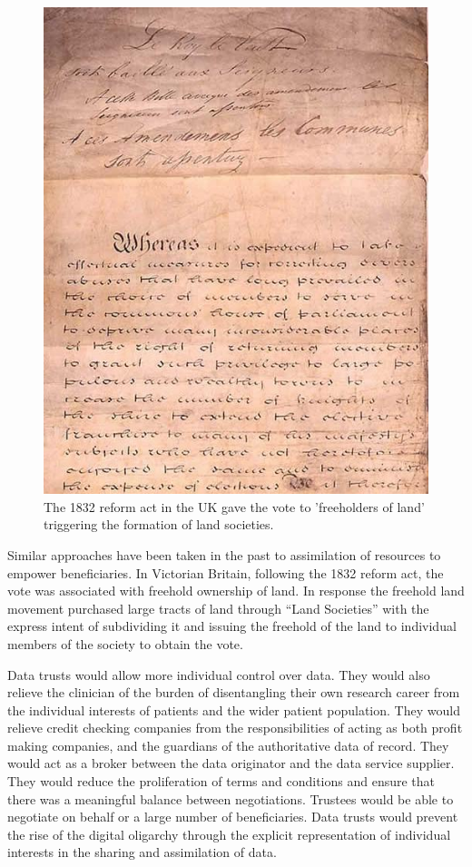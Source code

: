\documentclass[a4paper]{caesar_book}
\begin{document}
\begin{figure}[htbp]%
	\includegraphics[width=\textwidth]{pictures/Reform_Act_1832_First_Page.jpg}%
	\caption*{The 1832 reform act in the UK gave the vote to 'freeholders of land' triggering the formation of land societies.}%
	\label{reform-act}%
\end{figure}%

Similar approaches have been taken in the past to assimilation of resources to empower beneficiaries. In Victorian Britain, following the 1832 reform act, the vote was associated with freehold ownership of land. In response the freehold land movement purchased large tracts of land through “Land Societies” with the express intent of subdividing it and issuing the freehold of the land to individual members of the society to obtain the vote.

Data trusts would allow more individual control over data. They would also relieve the clinician of the burden of disentangling their own research career from the individual interests of patients and the wider patient population. They would relieve credit checking companies from the responsibilities of acting as both profit making companies, and the guardians of the authoritative data of record. They would act as a broker between the data originator and the data service supplier. They would reduce the proliferation of terms and conditions and ensure that there was a meaningful balance between negotiations. Trustees would be able to negotiate on behalf or a large number of beneficiaries. Data trusts would prevent the rise of the digital oligarchy through the explicit representation of individual interests in the sharing and assimilation of data.
\end{document}
